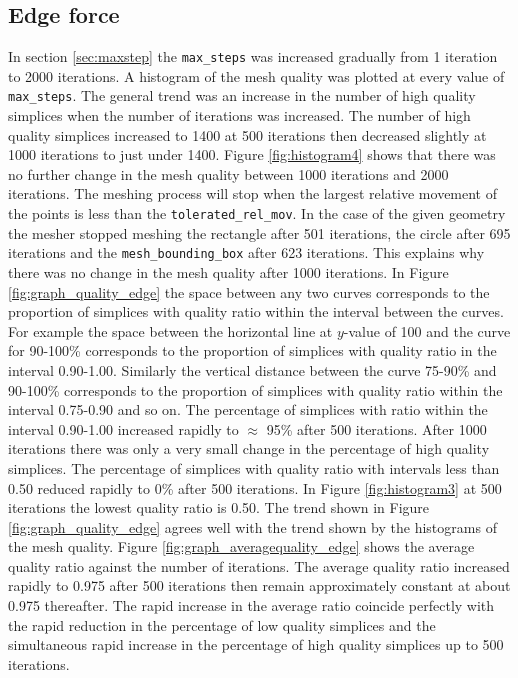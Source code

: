 \documentclass[10pt,a4paper]{book}
\begin{document}
\subsection{Edge force}
In section \ref{sec:maxstep} the \texttt{max\_steps} was increased gradually from 1 iteration to 2000 iterations. A histogram of the mesh quality was plotted at every value of \texttt{max\_steps}. The general trend was an increase in the number of high quality simplices when the number of iterations was increased. The number of high quality simplices increased to 1400 at 500 iterations then decreased slightly at 1000 iterations to just under 1400. Figure \ref{fig:histogram4} shows that there was no further change in the mesh quality between 1000 iterations and 2000 iterations. The meshing process will stop when the largest relative movement of the points is less than the \texttt{tolerated\_rel\_mov}. In the case of the given geometry the mesher stopped meshing the rectangle after 501 iterations, the circle after 695 iterations and the \texttt{mesh\_bounding\_box} after 623 iterations. This explains why there was no change in the mesh quality after 1000 iterations.
In Figure \ref{fig:graph_quality_edge} the space between any two curves corresponds to the proportion of simplices with quality ratio within the interval between the curves. For example the space between the horizontal line at $y$-value of 100 and the curve for 90-100\% corresponds to the proportion of simplices with quality ratio in the interval 0.90-1.00. Similarly the vertical distance between the curve 75-90\% and 90-100\% corresponds to the proportion of simplices with quality ratio within the interval 0.75-0.90 and so on. The percentage of simplices with ratio within the interval 0.90-1.00 increased rapidly to $\approx$ 95\% after 500 iterations. After 1000 iterations there was only a very small change in the percentage of high quality simplices. The percentage of simplices with quality ratio with intervals less than 0.50 reduced rapidly to 0\% after 500 iterations. In Figure \ref{fig:histogram3} at 500 iterations the lowest quality ratio is 0.50. The trend shown in Figure \ref{fig:graph_quality_edge} agrees well with the trend shown by the histograms of the mesh quality. Figure \ref{fig:graph_averagequality_edge} shows the average quality ratio against the number of iterations. The average quality ratio increased rapidly to 0.975 after 500 iterations then remain approximately constant at about 0.975 thereafter. The rapid increase in the average ratio coincide perfectly with the rapid reduction in the percentage of low quality simplices and the simultaneous rapid increase in the percentage of high quality simplices up to 500 iterations.
\end{document}
